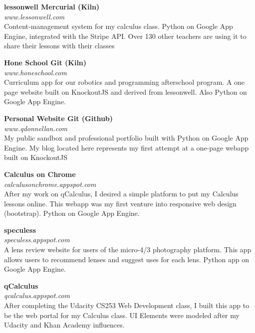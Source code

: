 \documentclass{article}
\begin{document}
\begin{multicols}{3}

{\bfseries lessonwell \hfill Mercurial (Kiln)} \\
\textit{www.lessonwell.com} \\
Content-management system for my calculus class. Python on Google App Engine, integrated with the Stripe API. Over 130 other teachers are using it to share their lessons with their classes

\columnbreak

{\bfseries Hone School \hfill Git (Kiln)} \\
\textit{www.honeschool.com} \\
Curriculum app for our robotics and programming afterschool program. A one page website built on KnockoutJS and derived from lessonwell. Also Python on Google App Engine. 

\columnbreak

{\bfseries Personal Website \hfill Git (Github)} \\
\textit{www.qdonnellan.com} \\
My public sandbox and professional portfolio built with  Python on Google App Engine. My blog located here represents my first attempt at a one-page webapp built on KnockoutJS

\end{multicols}

\begin{multicols}{3}

{\bfseries Calculus on Chrome } \\
\textit{calculusonchrome.appspot.com} \\
After my work on qCalculus, I desired a simple platform to put my Calculus lessons online. This webapp was my first venture into responsive web design (bootstrap). Python on Google App Engine.  

\columnbreak

{\bfseries speculess} \\
\textit{speculess.appspot.com} \\
A lens review website for users of the micro-4/3 photography platform. This app allows users to recommend lenses and suggest uses for each lens. Python app on Google App Engine. 

\columnbreak

{\bfseries qCalculus} \\
\textit{qcalculus.appspot.com} \\
After completing the Udacity CS253 Web Development class, I built this app to be the web portal for my Calculus class. UI Elements were modeled after my Udacity and Khan Academy influences. 

\end{multicols}
\end{document}
